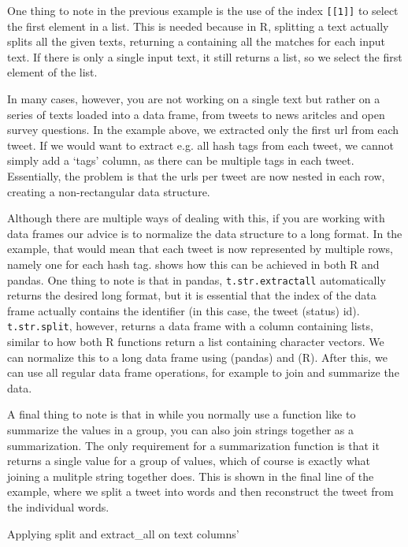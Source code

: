 One thing to note in the previous example is the use of the index \verb|[[1]]| to select the first element in a list.
This is needed because in R, splitting a text actually splits all the given texts, returning a  containing all the matches for each input text.
If there is only a single input text, it still returns a list, so we select the first element of the list.

In many cases, however, you are not working on a single text but rather on a series of texts loaded into a data frame,
from tweets to news aritcles and open survey questions.
In the example above, we extracted only the first url from each tweet.
If we would want to extract e.g. all hash tags from each tweet, we cannot simply add a `tags' column,
as there can be multiple tags in each tweet.
Essentially, the problem is that the urls per tweet are now nested in each row,
creating a non-rectangular data structure.

Although there are multiple ways of dealing with this,
if you are working with data frames our advice is to normalize the data structure to a long format.
In the example, that would mean that each tweet is now represented by multiple rows,
namely one for each hash tag.
 shows how this can be achieved in both R and pandas. 
One thing to note is that in pandas,
\verb!t.str.extractall! automatically returns the desired long format,
but it is essential that the index of the data frame actually contains the identifier (in this case, the tweet (status) id).
\verb!t.str.split!, however, returns a data frame with a column containing lists,
similar to how both R functions return a list containing character vectors.
We can normalize this to a long data frame using  (pandas) and  (R).
After this, we can use all regular data frame operations, for example to join and summarize the data.

A final thing to note is that in while you normally use a function like  to summarize the values in a group,
you can also join strings together as a summarization.
The only requirement for a summarization function is that it returns a single value for a group of values,
which of course is exactly what joining a mulitple string together does.
This is shown in the final line of the example, where we split a tweet into words and then reconstruct the tweet from the individual words.




\begin{ccsexample}
  \caption{Applying split and extract\_all on text columns'}\label{ex:splitlong}
\end{ccsexample}
